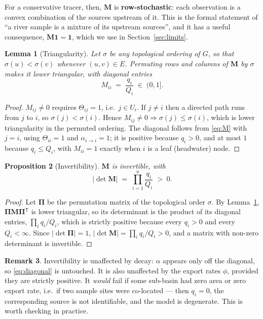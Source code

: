\documentclass[11pt]{article}
\newcommand{\Mmat}{\ensuremath{\mathbf{M}}\xspace}
\newcommand{\onevec}{\ensuremath{\mathbf{1}}\xspace}
\newcommand{\transpose}{\ensuremath{^{\mathsf{T}}}}
\newtheorem{theorem}{Proposition}
\newtheorem{lemma}[theorem]{Lemma}
\theoremstyle{definition}
\newtheorem{remark}[theorem]{Remark}
\begin{document}
\noindent For a conservative tracer, then, $\Mmat$ is \textbf{row-stochastic}: each observation
is a convex combination of the sources upstream of it. This is the formal statement of ``a
river sample is a mixture of its upstream sources'', and it has a useful consequence,
$\Mmat \onevec = \onevec$, which we use in Section~\ref{sec:limits}.

\begin{lemma}[Triangularity]\label{lem:triangular}
Let $\sigma$ be any topological ordering of $G$, so that $\sigma(u) < \sigma(v)$ whenever
$(u,v) \in E$. Permuting rows and columns of $\Mmat$ by $\sigma$ makes it lower triangular,
with diagonal entries
\begin{equation}
  M_{ii} \;=\; \frac{q_i}{Q_i} \;\in\; (0, 1] .
  \label{eq:diagonal}
\end{equation}
\end{lemma}

\begin{proof}
$M_{ij} \ne 0$ requires $\Theta_{ij} = 1$, i.e.\ $j \in U_i$. If $j \ne i$ then a directed
path runs from $j$ to $i$, so $\sigma(j) < \sigma(i)$. Hence $M_{ij} \ne 0 \Rightarrow
\sigma(j) \le \sigma(i)$, which is lower triangularity in the permuted ordering. The diagonal
follows from \eqref{eq:M} with $j = i$, using $\Theta_{ii} = 1$ and $\alpha_{i \to i} = 1$; it
is positive because $q_i > 0$, and at most $1$ because $q_i \le Q_i$, with $M_{ii} = 1$ exactly
when $i$ is a leaf (headwater) node.
\end{proof}

\begin{theorem}[Invertibility]\label{prop:invertible}
$\Mmat$ is invertible, with
\begin{equation}
  \left| \det \Mmat \right| \;=\; \prod_{i=1}^{n} \frac{q_i}{Q_i} \;>\; 0 .
\end{equation}
\end{theorem}

\begin{proof}
Let $\bm{\Pi}$ be the permutation matrix of the topological order $\sigma$. By
Lemma~\ref{lem:triangular}, $\bm{\Pi}\Mmat\bm{\Pi}\transpose$ is lower triangular, so its
determinant is the product of its diagonal entries, $\prod_i q_i / Q_i$, which is strictly
positive because every $q_i > 0$ and every $Q_i < \infty$. Since $|\det \bm{\Pi}| = 1$,
$|\det \Mmat| = \prod_i q_i/Q_i > 0$, and a matrix with non-zero determinant is invertible.
\end{proof}

\begin{remark}
Invertibility is unaffected by decay: $\alpha$ appears only off the diagonal, so
\eqref{eq:diagonal} is untouched. It is also unaffected by the export rates $\phi$, provided
they are strictly positive. It \textit{would} fail if some sub-basin had zero area or zero
export rate, i.e.\ if two sample sites were co-located --- then $q_i = 0$, the corresponding
source is not identifiable, and the model is degenerate. This is worth checking in practice.
\end{remark}
\end{document}
